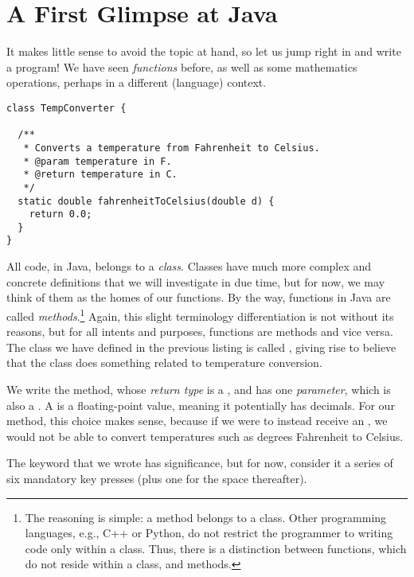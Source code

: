\section{A First Glimpse at Java}
It makes little sense to avoid the topic at hand, so let us jump right in and write a program! We have seen \textit{functions} before, as well as some mathematics operations, perhaps in a different (language) context. 


\begin{cl}[]{}
\begin{lstlisting}[language=MyJava]
class TempConverter {
  
  /**
   * Converts a temperature from Fahrenheit to Celsius.
   * @param temperature in F.
   * @return temperature in C.
   */
  static double fahrenheitToCelsius(double d) {
    return 0.0;
  }
}
\end{lstlisting}
\end{cl}

All code, in Java, belongs to a \textit{class}. Classes have much more complex and concrete definitions that we will investigate in due time, but for now, we may think of them as the homes of our functions. By the way, functions in Java are called \textit{methods}.\footnote{The reasoning is simple: a method belongs to a class. Other programming languages, e.g., C++ or Python, do not restrict the programmer to writing code only within a class. Thus, there is a distinction between functions, which do not reside within a class, and methods.} Again, this slight terminology differentiation is not without its reasons, but for all intents and purposes, functions are methods and vice versa. The class we have defined in the previous listing is called , giving rise to believe that the class does something related to temperature conversion.

We write the  method, whose \textit{return type} is a , and has one \textit{parameter}, which is also a . A  is a floating-point value, meaning it potentially has decimals. For our method, this choice makes sense, because if we were to instead receive an , we would not be able to convert temperatures such as  degrees Fahrenheit to Celsius. 

The  keyword that we wrote has significance, but for now, consider it a series of six mandatory key presses (plus one for the space thereafter).

